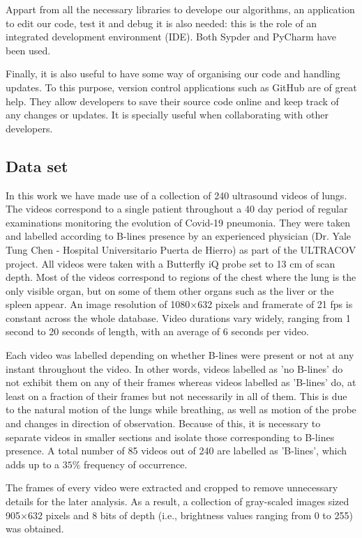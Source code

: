 \documentclass[12pt]{article} %
\begin{document}
	Appart from all the necessary libraries to develope our algorithms, an application to edit our code, test it and debug it is also needed: this is the role of an integrated development environment (IDE). Both Sypder\cite{spyder} and PyCharm\cite{pycharm} have been used.
	
	Finally, it is also useful to have some way of organising our code and handling updates. To this purpose, version control applications such as GitHub are of great help. They allow developers to save their source code online and keep track of any changes or updates. It is specially useful when collaborating with other developers.


\subsection{Data set}

	In this work we have made use of a collection of 240 ultrasound videos of lungs. The videos correspond to a single patient throughout a 40 day period of regular examinations monitoring the evolution of Covid-19 pneumonia. They were taken and labelled according to B-lines presence by an experienced physician (Dr. Yale Tung Chen \cite{tung2020lung}
	 - Hospital Universitario Puerta de Hierro) as part of the ULTRACOV project. All videos were taken with a Butterfly iQ probe set to 13 cm of scan depth. Most of the videos correspond to regions of the chest where the lung is the only visible organ, but on some of them other organs such as the liver or the spleen appear. An image resolution of 1080$\times$632 pixels and framerate of 21 fps is constant across the whole database. Video durations vary widely, ranging from 1 second to 20 seconds of length, with an average of 6 seconds per video. 
	
	Each video was labelled depending on whether B-lines were present or not at any instant throughout the video. In other words, videos labelled as 'no B-lines' do not exhibit them on any of their frames whereas videos labelled as 'B-lines' do, at least on a fraction of their frames but not necessarily in all of them. This is due to the natural motion of the lungs while breathing, as well as motion of the probe and changes in direction of observation. Because of this, it is necessary to  separate videos in smaller sections and isolate those corresponding to B-lines presence. A total number of 85 videos out of 240 are labelled as 'B-lines', which adds up to a $35 \%$ frequency of occurrence. 
	
	The frames of every video were extracted and cropped to remove unnecessary details for the later analysis. As a result, a collection of gray-scaled images sized 905$\times$632 pixels and 8 bits of depth (i.e., brightness values ranging from 0 to 255) was obtained. 
	
\end{document}

